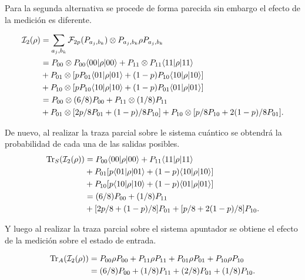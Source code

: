 Para la segunda alternativa se procede de forma parecida sin embargo el efecto de la medición es diferente.


\begin{equation}\label{segunda_alternativa_ejemplo1}
    \begin{split}
        \mathcal{I}_2(\rho)&=\sum_{a_j,b_k}\mathcal{F}_{2p}(P_{a_j,b_k})\otimes P_{a_j,b_k} \rho P_{a_j,b_k}\\
        &=P_{00}\otimes P_{00} \langle 00|\rho|00\rangle + P_{11}\otimes P_{11} \langle 11|\rho|11\rangle\\
        &+P_{01} \otimes [pP_{01} \langle 01|\rho|01\rangle+(1-p)P_{10}\langle 10|\rho|10\rangle]\\
        &+P_{10} \otimes [p P_{10}\langle 10|\rho|10\rangle+(1-p)P_{01}\langle 01|\rho|01\rangle]\\
        &=P_{00}\otimes (6/8)P_{00} + P_{11}\otimes (1/8)P_{11}\\
        &+   P_{01} \otimes [2p/8P_{01} +(1-p)/8P_{10}]+P_{10} \otimes[p/8 P_{10}+2(1-p)/8 P_{01}].\\
    \end{split}
\end{equation}


De nuevo, al realizar la traza parcial sobre le sistema cuántico se obtendrá la probabilidad de cada una de las salidas posibles.
\begin{equation}\label{traza_S2_ejemplo1}
    \begin{split}
        {\rm Tr}_S(\mathcal{I}_2(\rho)) &= P_{00} \langle 00|\rho|00\rangle + P_{11} \langle 11|\rho|11\rangle\\
        &+P_{01}[p \langle 01|\rho|01\rangle+(1-p)\langle 10|\rho|10\rangle]\\
        &+P_{10}[p \langle 10|\rho|10\rangle+(1-p)\langle 01|\rho|01\rangle]\\
        &=(6/8)P_{00} + (1/8)P_{11}\\
        &+[2p/8 +(1-p)/8]P_{01}+ [p/8+2(1-p)/8]P_{10}.\\
    \end{split}
\end{equation}

Y luego al realizar la traza parcial sobre el sistema apuntador se obtiene el efecto de la medición sobre el estado de entrada.

\begin{equation}\label{traza_A2_ejemplo1}
    \begin{split}
        {\rm Tr}_A(\mathcal{I}_2(\rho)) &= P_{00} \rho P_{00} + P_{11}\rho P_{11}+ P_{01}\rho P_{01}+ P_{10}\rho P_{10}\\
        &=(6/8)P_{00} + (1/8)P_{11}+(2/8)P_{01} + (1/8)P_{10}.\\
    \end{split}
\end{equation}

